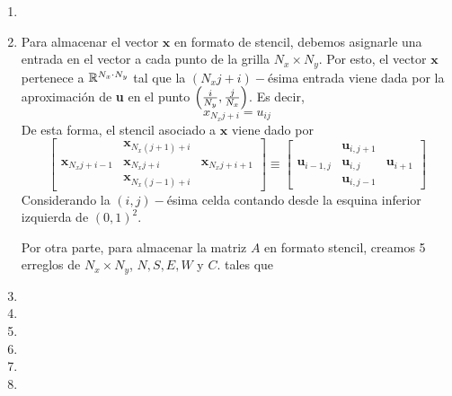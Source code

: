 \begin{enumerate}[label=\bf\arabic*.]
	\item 
	\item Para almacenar el vector $\textbf{x}$ en formato de stencil, debemos asignarle una entrada en el vector a cada punto de la grilla $N_x\times N_y$. Por esto, el vector $\textbf{x}$ pertenece a $\mathbb{R}^{N_x\cdot N_y}$ tal que la $(N_xj + i)-$ésima entrada viene dada por la aproximación de \textbf{u} en el punto $\left( \frac{i}{N_y}, \frac{j}{N_x}  \right)$. Es decir,
		\[
			x_{N_xj + i} = u_{ij}
		\]
		De esta forma, el stencil asociado a $\textbf{x}$ viene dado por
		\[
			\begin{bmatrix}
				& \textbf{x}_{N_x(j+1)+i} & \\
				\textbf{x}_{N_xj + i - 1} & \textbf{x}_{N_xj + i} & \textbf{x}_{N_xj + i + 1} \\
				& \textbf{x}_{N_x(j - 1) + i} &
			\end{bmatrix} \equiv
			\begin{bmatrix}
				& \textbf{u}_{i,j+1} & \\
				\textbf{u}_{i-1,j} & \textbf{u}_{i,j} & \textbf{u}_{i + 1} \\
				& \textbf{u}_{i,j-1} &
			\end{bmatrix}
		\]
		Considerando la $(i,j)-$ésima celda contando desde la esquina inferior izquierda de $(0,1)^2$.

		Por otra parte, para almacenar la matriz $A$ en formato stencil, creamos 5 erreglos de $N_x\times N_y$, $N, S, E, W$ y $C$. tales que 
	\item
	\item
	\item
	\item
	\item
	\item
\end{enumerate}

